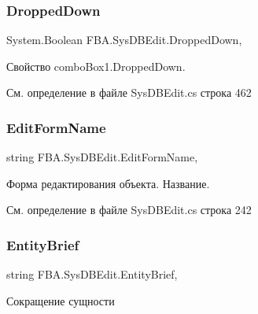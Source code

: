 \subsubsection{\texorpdfstring{Dropped\+Down}{DroppedDown}}
{\footnotesize\ttfamily System.\+Boolean F\+B\+A.\+Sys\+D\+B\+Edit.\+Dropped\+Down\hspace{0.3cm}{\ttfamily [get]}, {\ttfamily [set]}}



Свойство combo\+Box1.\+Dropped\+Down. 



См. определение в файле Sys\+D\+B\+Edit.\+cs строка 462

\mbox{\label{class_f_b_a_1_1_sys_d_b_edit_ac6c5b5a75b67271359ed817242a3567b}} 
\subsubsection{\texorpdfstring{Edit\+Form\+Name}{EditFormName}}
{\footnotesize\ttfamily string F\+B\+A.\+Sys\+D\+B\+Edit.\+Edit\+Form\+Name\hspace{0.3cm}{\ttfamily [get]}, {\ttfamily [set]}}



Форма редактирования объекта. Название. 



См. определение в файле Sys\+D\+B\+Edit.\+cs строка 242

\mbox{\label{class_f_b_a_1_1_sys_d_b_edit_adeb4184205de5251176a05fb3103002f}} 
\subsubsection{\texorpdfstring{Entity\+Brief}{EntityBrief}}
{\footnotesize\ttfamily string F\+B\+A.\+Sys\+D\+B\+Edit.\+Entity\+Brief\hspace{0.3cm}{\ttfamily [get]}, {\ttfamily [set]}}



Сокращение сущности 



